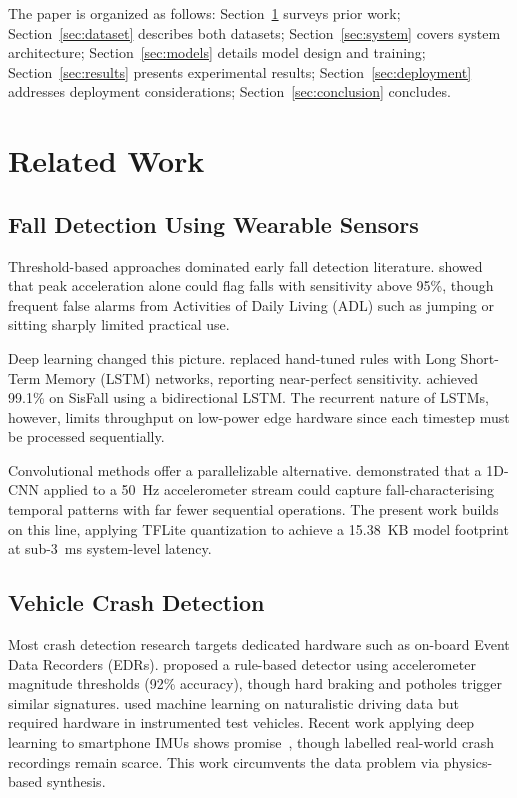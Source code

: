 \documentclass[12pt,a4paper]{article}
\begin{document}
The paper is organized as follows: Section~\ref{sec:related} surveys prior
work; Section~\ref{sec:dataset} describes both datasets;
Section~\ref{sec:system} covers system architecture;
Section~\ref{sec:models} details model design and training;
Section~\ref{sec:results} presents experimental results;
Section~\ref{sec:deployment} addresses deployment considerations;
Section~\ref{sec:conclusion} concludes.

\section{Related Work}
\label{sec:related}

\subsection{Fall Detection Using Wearable Sensors}

Threshold-based approaches dominated early fall detection literature.
\citet{kangas2008} showed that peak acceleration alone could flag falls with
sensitivity above 95\%, though frequent false alarms from Activities of Daily
Living (ADL) such as jumping or sitting sharply limited practical use.

Deep learning changed this picture. \citet{musci2020} replaced hand-tuned
rules with Long Short-Term Memory (LSTM) networks, reporting near-perfect
sensitivity. \citet{nho2021} achieved 99.1\% on SisFall using a bidirectional
LSTM. The recurrent nature of LSTMs, however, limits throughput on low-power
edge hardware since each timestep must be processed sequentially.

Convolutional methods offer a parallelizable alternative. \citet{wang2020cnn}
demonstrated that a 1D-CNN applied to a 50~Hz accelerometer stream could
capture fall-characterising temporal patterns with far fewer sequential
operations. The present work builds on this line, applying TFLite quantization
to achieve a 15.38~KB model footprint at sub-3~ms system-level latency.

\subsection{Vehicle Crash Detection}

Most crash detection research targets dedicated hardware such as on-board
Event Data Recorders (EDRs). \citet{bhatt2017} proposed a rule-based detector
using accelerometer magnitude thresholds (92\% accuracy), though hard braking
and potholes trigger similar signatures. \citet{jiang2020} used machine
learning on naturalistic driving data but required hardware in instrumented
test vehicles. Recent work applying deep learning to smartphone IMUs shows
promise~\citep{smartphone_crash2024}, though labelled real-world crash
recordings remain scarce. This work circumvents the data problem via
physics-based synthesis.
\end{document}
